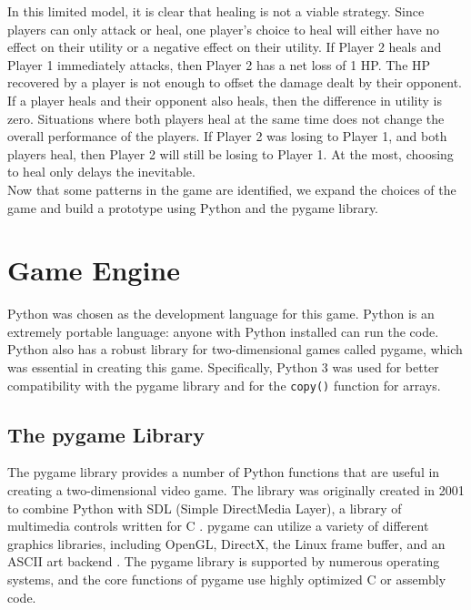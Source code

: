 In this limited model, it is clear that healing is not a viable strategy. Since players can only attack or heal, one player's choice to heal will either have no effect on their utility or a negative effect on their utility. If Player 2 heals and Player 1 immediately attacks, then Player 2 has a net loss of 1 HP. The HP recovered by a player is not enough to offset the damage dealt by their opponent. If a player heals and their opponent also heals, then the difference in utility is zero. Situations where both players heal at the same time does not change the overall performance of the players. If Player 2 was losing to Player 1, and both players heal, then Player 2 will still be losing to Player 1. At the most, choosing to heal only delays the inevitable.\\

Now that some patterns in the game are identified, we expand the choices of the game and build a prototype using Python and the pygame library.

\section{Game Engine}
Python was chosen as the development language for this game. Python is an extremely portable language: anyone with Python installed can run the code. Python also has a robust library for two-dimensional games called pygame, which was essential in creating this game. Specifically, Python 3 was used for better compatibility with the pygame library and for the \texttt{copy()} function for arrays.

\subsection{The pygame Library}
The pygame library provides a number of Python functions that are useful in creating a two-dimensional video game. The library was originally created in 2001 to combine Python with SDL (Simple DirectMedia Layer), a library of multimedia controls written for C \cite{shinners}. pygame can utilize a variety of different graphics libraries, including OpenGL, DirectX, the Linux frame buffer, and an ASCII art backend \cite{shinners}. The pygame library is supported by numerous operating systems, and the core functions of pygame use highly optimized C or assembly code.\\

